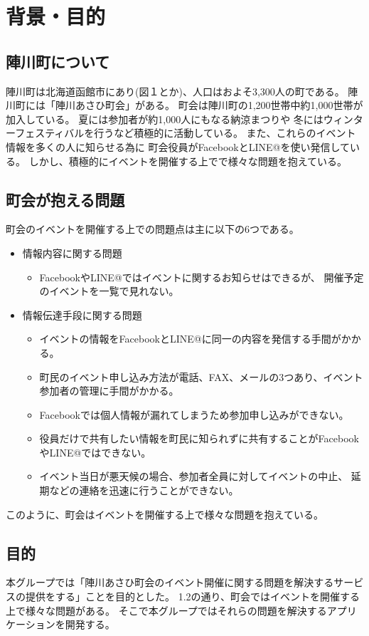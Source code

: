 \chapter{背景・目的}

\section{陣川町について}
陣川町は北海道函館市にあり(図１とか)、人口はおよそ3,300人の町である。
陣川町には「陣川あさひ町会」がある。
町会は陣川町の1,200世帯中約1,000世帯が加入している。
夏には参加者が約1,000人にもなる納涼まつりや
冬にはウィンターフェスティバルを行うなど積極的に活動している。
また、これらのイベント情報を多くの人に知らせる為に
町会役員がFacebookとLINE@を使い発信している。
しかし、積極的にイベントを開催する上でで様々な問題を抱えている。

\section{町会が抱える問題}
町会のイベントを開催する上での問題点は主に以下の6つである。
\begin{itemize}
    \item 情報内容に関する問題
    \begin{itemize}
        \item FacebookやLINE@ではイベントに関するお知らせはできるが、
              開催予定のイベントを一覧で見れない。
    \end{itemize}
    \item 情報伝達手段に関する問題
    \begin{itemize}
        \item イベントの情報をFacebookとLINE@に同一の内容を発信する手間がかかる。
        \item 町民のイベント申し込み方法が電話、FAX、メールの3つあり、イベント参加者の管理に手間がかかる。
        \item Facebookでは個人情報が漏れてしまうため参加申し込みができない。
        \item 役員だけで共有したい情報を町民に知られずに共有することがFacebookやLINE@ではできない。
    \end{itemize}
    \begin{itemize}
        \item イベント当日が悪天候の場合、参加者全員に対してイベントの中止、
              延期などの連絡を迅速に行うことができない。
    \end{itemize}
\end{itemize}
このように、町会はイベントを開催する上で様々な問題を抱えている。

\section{目的}
本グループでは「陣川あさひ町会のイベント開催に関する問題を解決するサービスの提供をする」ことを目的とした。
1.2の通り、町会ではイベントを開催する上で様々な問題がある。
そこで本グループではそれらの問題を解決するアプリケーションを開発する。

